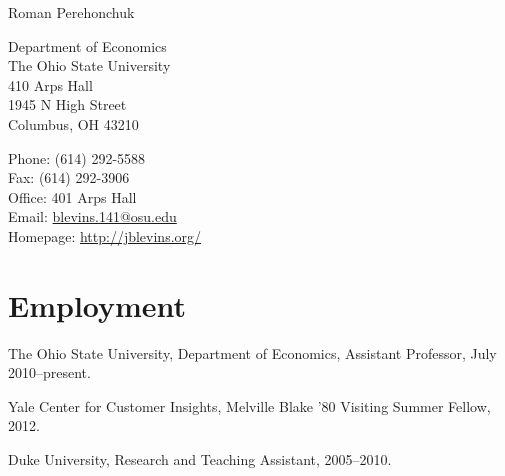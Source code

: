 \documentclass[10pt,letterpaper]{article}
\def\name{Roman Perehonchuk}
\renewenvironment{itemize}{
  \begin{list}{}{
    \setlength{\leftmargin}{1.5em}
    \setlength{\itemsep}{0.25em}
    \setlength{\parskip}{0pt}
    \setlength{\parsep}{0.25em}
  }
}{
  \end{list}
}
\begin{document}
{\huge \name}


\bigskip

\begin{minipage}[t]{0.495\textwidth}
  Department of Economics \\
  The Ohio State University \\
  410 Arps Hall \\
  1945 N High Street \\
  Columbus, OH 43210
\end{minipage}
\begin{minipage}[t]{0.495\textwidth}
  Phone: (614) 292-5588 \\
  Fax: (614) 292-3906 \\
  Office: 401 Arps Hall \\
  Email: \href{mailto:blevins.141@osu.edu}{blevins.141@osu.edu} \\
  Homepage: \href{http://jblevins.org/}{http://jblevins.org/}
\end{minipage}

\section*{Employment}

\begin{itemize}
\item The Ohio State University, Department of Economics,
  Assistant Professor, July 2010--present.
\item Yale Center for Customer Insights,
  Melville Blake '80 Visiting Summer Fellow,
  2012.
\item Duke University,
  Research and Teaching Assistant,
  2005--2010.
\end{itemize}
\end{document}
